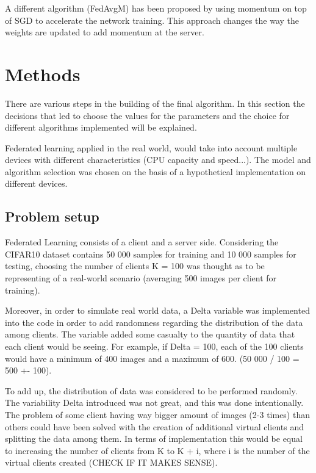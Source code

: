 \documentclass[twocolumn]{article}
\begin{document}
A different algorithm (FedAvgM) has been proposed by \cite{DBLP:journals/corr/abs-1909-06335} using momentum on top of SGD to accelerate the network training. This approach changes the way the weights are updated to add momentum at the server.

\section{Methods} %
There are various steps in the building of the final algorithm. In this section the decisions that led to choose the values for the parameters and the choice for different algorithms implemented will be explained. 

Federated learning applied in the real world, would take into account multiple devices with different characteristics (CPU capacity and speed...). The model and algorithm selection was chosen on the basis of a hypothetical implementation on different devices.  

\subsection{Problem setup}
Federated Learning consists of a client and a server side. Considering the CIFAR10 dataset contains 50 000 samples for training and 10 000 samples for testing, choosing the number of clients K = 100 was thought as to be representing of a real-world scenario (averaging 500 images per client for training). 

Moreover, in order to simulate real world data, a Delta variable was implemented into the code in order to add randomness regarding the distribution of the data among clients. The variable added some casualty to the quantity of data that each client would be seeing. For example, if Delta = 100, each of the 100 clients would have a minimum of 400 images and a maximum of 600. (50 000 / 100 = 500 +- 100).


To add up, the distribution of data was considered to be performed randomly. The variability Delta introduced was not great, and this was done intentionally. The problem of some client having way bigger amount of images (2-3 times) than others could have been solved with the creation of additional virtual clients and splitting the data among them. In terms of implementation this would be equal to increasing the number of clients from K to K + i, where i is the number of the virtual clients created (CHECK IF IT MAKES SENSE). 
\end{document}
